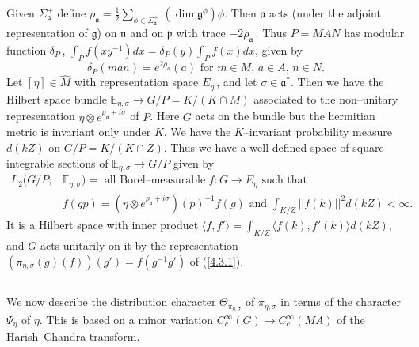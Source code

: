 \documentclass{conm-p-l}
\renewcommand{\gg}{\mathfrak{g}}
\newcommand{\gp}{\mathfrak{p}}
\def\ga{\mathfrak{a}}
\def\gg{\mathfrak{g}}
\def\gn{\mathfrak{n}}
\def\gp{\mathfrak{p}}
\def\E{\mathbb{E}}
\begin{document}
Given $\Sigma_\ga^+$ define 
$\rho_\ga = \tfrac{1}{2}\sum_{\phi \in \Sigma_\ga^+}\,(\dim \gg^\phi)\phi$.
Then $\ga$ acts (under the adjoint representation of $\gg$) on $\gn$ and
on $\gp$ with trace $-2\rho_\ga$\,.  Thus $P = MAN$ has modular function
$\delta_P$\,, $\int_P f(xy^{-1})dx = \delta_P(y)\int_P f(x)dx$, given by
\begin{equation}\label{4.3.2}
\delta_P(man) = e^{2\rho_a}(a) \text{ for } m \in M,\, a \in A,\, n \in N.
\end{equation}
Let $[\eta] \in \widehat{M}$ with representation space $E_\eta$\,, and let
$\sigma \in \ga^*$.  Then we have the Hilbert space bundle
$\E_{\eta,\sigma} \to G/P = K/(K\cap M)$ associated to the non--unitary
representation $\eta \otimes e^{\rho_\ga + i\sigma}$ of $P$.  Here $G$
acts on the bundle but the hermitian metric is invariant only under $K$.
We have the $K$--invariant probability measure $d(kZ)$ on $G/P = K/(K\cap Z)$.
Thus we have a well defined  space of square integrable sections of
$\E_{\eta,\sigma} \to G/P$ given by
\begin{equation}\label{4.3.3}
\begin{aligned}
L_2(G/P;&\E_{\eta,\sigma}) = \text{ all Borel--measurable } f:G \to E_\eta
	\text{ such that } \\
&f(gp) = (\eta\otimes e^{\rho_\ga + i\sigma})(p)^{-1}f(g) \text{ and }
	{\int}_{K/Z} ||f(k)||^2 d(kZ) < \infty.
\end{aligned}
\end{equation}
It is a Hilbert space with inner product $\langle f, f'\rangle =
{\int}_{K/Z} \langle f(k),f'(k)\rangle d(kZ)$, and $G$ acts unitarily on
it by the representation 
$(\pi_{\eta,\sigma}(g)(f))(g') = f(g^{-1}g')$ of (\ref{4.3.1}).

\subsection{}\label{ssec4d}\setcounter{equation}{0}
We now describe the distribution character $\Theta_{\pi_{\eta,\sigma}}$
of $\pi_{\eta,\sigma}$ in terms of the character $\Psi_\eta$ of $\eta$.
This is based on a minor variation $C^\infty_c(G) \to C^\infty_c(MA)$ 
of the Harish--Chandra transform.
\end{document}
